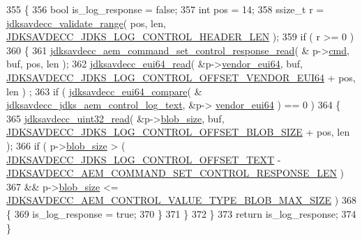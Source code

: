 \begin{DoxyCode}
355 \{
356     \textcolor{keywordtype}{bool} is\_log\_response = \textcolor{keyword}{false};
357     \textcolor{keywordtype}{int} pos = 14;
358     ssize\_t r = \hyperlink{group__util_ga9c02bdfe76c69163647c3196db7a73a1}{jdksavdecc\_validate\_range}( pos, len, 
      \hyperlink{group__jdks__log_gaade756dffaac6e4f6d3d3b16e4cea38b}{JDKSAVDECC\_JDKS\_LOG\_CONTROL\_HEADER\_LEN} );
359     \textcolor{keywordflow}{if} ( r >= 0 )
360     \{
361         \hyperlink{group__command__set__control__response_ga51e9c0e9f925de9340edeb0c66bb6b5a}{jdksavdecc\_aem\_command\_set\_control\_response\_read}( &
      p->\hyperlink{group__jdks_ga38de55b081b42c70b4caeb189e999cef}{cmd}, buf, pos, len );
362         \hyperlink{group__eui64_ga7c7ee5c2d293106f4d997affcbc3ef15}{jdksavdecc\_eui64\_read}( &p->\hyperlink{group__jdks_ga6183c85748a8af0003d293d653c4ae9b}{vendor\_eui64}, buf, 
      \hyperlink{group__jdks__log_gaa09f0dec1864081c2abbc426b9e387fd}{JDKSAVDECC\_JDKS\_LOG\_CONTROL\_OFFSET\_VENDOR\_EUI64} + pos, len )
      ;
363         \textcolor{keywordflow}{if} ( \hyperlink{group__eui64_ga1d7414dc665866d8ad0af100f8a52ef2}{jdksavdecc\_eui64\_compare}( &
      \hyperlink{group__jdks__log_ga492c3be3079a48fdf9366bdc514c0333}{jdksavdecc\_jdks\_aem\_control\_log\_text}, &p->
      \hyperlink{group__jdks_ga6183c85748a8af0003d293d653c4ae9b}{vendor\_eui64} ) == 0 )
364         \{
365             \hyperlink{group__endian_gaf75f53076978e7b51f12c19414e6070e}{jdksavdecc\_uint32\_read}( &p->\hyperlink{group__jdks_ga32143551b70893faef60f6e35f88ed50}{blob\_size}, buf, 
      \hyperlink{group__jdks__log_ga14027480ca9c47f6e02e3d96e3e9a1ad}{JDKSAVDECC\_JDKS\_LOG\_CONTROL\_OFFSET\_BLOB\_SIZE} + pos, len );
366             \textcolor{keywordflow}{if} ( p->\hyperlink{group__jdks_ga32143551b70893faef60f6e35f88ed50}{blob\_size} > ( 
      \hyperlink{group__jdks__log_gaa3f2c42190fdfb5a9f8927254dcc38f0}{JDKSAVDECC\_JDKS\_LOG\_CONTROL\_OFFSET\_TEXT} - 
      \hyperlink{group__command__set__control__response_gad54c9d8dd021fce5cb24c880401d316f}{JDKSAVDECC\_AEM\_COMMAND\_SET\_CONTROL\_RESPONSE\_LEN} )
367                  && p->\hyperlink{group__jdks_ga32143551b70893faef60f6e35f88ed50}{blob\_size} <= 
      \hyperlink{group__aem__command_ga91176affe15020f1b22b04518eeb3d30}{JDKSAVDECC\_AEM\_CONTROL\_VALUE\_TYPE\_BLOB\_MAX\_SIZE} )
368             \{
369                 is\_log\_response = \textcolor{keyword}{true};
370             \}
371         \}
372     \}
373     \textcolor{keywordflow}{return} is\_log\_response;
374 \}
\end{DoxyCode}



